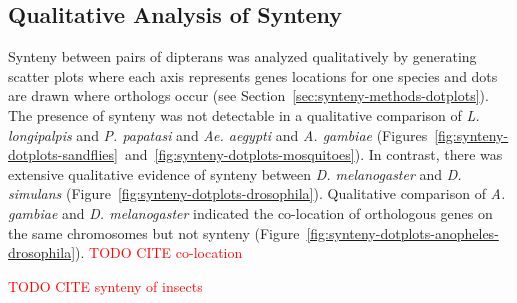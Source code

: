 \subsection{Qualitative Analysis of Synteny}
Synteny between pairs of dipterans was analyzed qualitatively by generating scatter plots where each axis represents genes locations for one species and dots are drawn where orthologs occur (see Section~\ref{sec:synteny-methods-dotplots}). The presence of synteny was not detectable in a qualitative comparison of \emph{L. longipalpis} and \emph{P. papatasi} and \emph{Ae. aegypti} and \emph{A. gambiae} (Figures~\ref{fig:synteny-dotplots-sandflies}~and~\ref{fig:synteny-dotplots-mosquitoes}).  In contrast, there was extensive qualitative evidence of synteny between \emph{D. melanogaster} and \emph{D. simulans} (Figure~\ref{fig:synteny-dotplots-drosophila}).  Qualitative comparison of \emph{A. gambiae} and \emph{D. melanogaster} indicated the co-location of orthologous genes on the same chromosomes but not synteny (Figure~\ref{fig:synteny-dotplots-anopheles-drosophila}). \textcolor{red}{TODO CITE co-location}

\textcolor{red}{TODO CITE synteny of insects}


